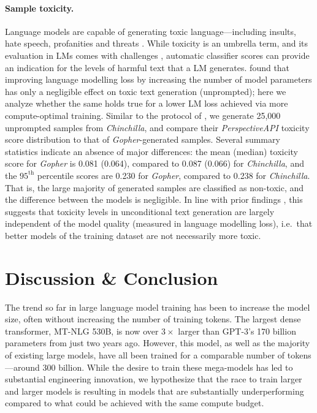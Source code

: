 \documentclass[11pt, a4paper, logo, copyright, nonumbering]{deepmind}
\newcommand{\gopher}{\textit{Gopher}\xspace}
\newcommand{\chinchilla}{\textit{Chinchilla}\xspace}
\newcommand{\mtnlg}{MT-NLG 530B\xspace}
\begin{document}
\paragraph{Sample toxicity.} 
Language models are capable of generating toxic language---including insults, hate speech, profanities and threats \citep{gehman2020realtoxicityprompts,rae2021gopher}.
%
While toxicity is an umbrella term, and its evaluation in LMs comes with challenges \citep{xu2021detoxifying,welbl2021challenges}, automatic classifier scores can provide an indication for the levels of harmful text that a LM generates. 
\citet{rae2021gopher} found that improving language modelling loss by increasing the number of model parameters has only a negligible effect on toxic text generation (unprompted); here we analyze whether the same holds true for a lower LM loss achieved via more compute-optimal training.
Similar to the protocol of \citet{rae2021gopher}, we generate 25,000 unprompted samples from \chinchilla, and compare their \textit{PerspectiveAPI} toxicity score distribution to that of \gopher-generated samples.
Several summary statistics indicate an absence of major differences:
the mean (median) toxicity score for \gopher is 0.081 (0.064), compared to 0.087 (0.066) for \chinchilla, and the $95^{\textrm{th}}$ percentile scores are 0.230 for \gopher, compared to 0.238 for \chinchilla. 
%
That is, the large majority of generated samples are classified as non-toxic, and the difference between the models is negligible.
%
In line with prior findings \citep{rae2021gopher}, this suggests that toxicity levels in unconditional text generation are largely independent of the model quality (measured in language modelling loss), i.e.~that better models of the training dataset are not necessarily more toxic.

\section{Discussion \& Conclusion}
The trend so far in large language model training has been to increase the model size, often without increasing the number of training tokens. 
The largest dense transformer, \mtnlg, is now over $3 \times$ larger than GPT-3's 170 billion parameters from just two years ago.
However, this model, as well as the majority of existing large models, have all been trained for a comparable number of tokens---around 300 billion.
While the desire to train these mega-models has led to substantial engineering innovation, we hypothesize that the race to train larger and larger models is resulting in models that are substantially underperforming compared to what could be achieved with the same compute budget.
\end{document}
